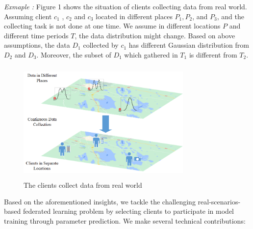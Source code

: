 \documentclass[conference]{IEEEtran}
\begin{document}
\textit{Exmaple :} Figure 1 shows the situation of clients collecting data from real world.
Assuming client $c_1$ , $c_2$ and $c_3$ located in different
places $P_1, P_2$, and $P_3$, and the collecting task is not done 
at one time. We assume in different locations $P$ 
and different time periods $T$, the data distribution 
might change. Based on above assumptions, the data $D_1$ 
collected by $c_1$ has different Gaussian distribution 
from $D_2$ and $D_3$. Moreover, the subset of $D_1$ which 
gathered in $T_1$ is different from $T_2$.
\begin{figure}
  \centering
  \includegraphics[height=6cm,width=8.6cm]{Fig1.png}
  \caption{The clients collect data from real world}
  \label{problem}
\end{figure}

Based on the aforementioned insights,  
we tackle the challenging real-scenarios-based federated
learning problem by selecting clients to participate in model
training through parameter prediction. We make several 
technical contributions:
	
\end{document}
